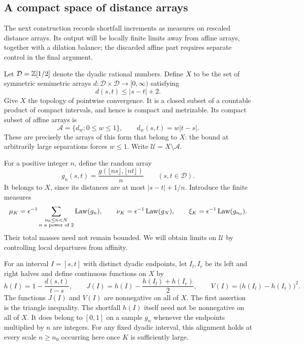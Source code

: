 \subsection{A compact space of distance arrays}

The next construction records shortfall increments as measures on
rescaled distance arrays. Its output will be locally finite limits
away from affine arrays, together with a dilation balance; the
discarded affine part requires separate control in the final argument.

Let $\mathcal D=\mathbb{Z}[1/2]$ denote the dyadic rational numbers. Define
$X$ to be the set of symmetric semimetric arrays
$d:\mathcal D\times\mathcal D\to[0,\infty)$ satisfying
\begin{equation}\label{scale:ambient-bound}
 d(s,t)\le|s-t|+2.
\end{equation}
Give $X$ the topology of pointwise convergence. It is a closed subset
of a countable product of compact intervals, and hence is compact
and metrizable. Its compact subset of affine arrays is
\[
 \mathcal A=\{d_w:0\le w\le1\},\qquad d_w(s,t)=w|t-s|.
\]
These are precisely the arrays of this form that belong to $X$:
the bound at arbitrarily large separations forces $w\le1$.
Write $\mathcal U=X\setminus\mathcal A$.

For a positive integer $n$, define the random array
\begin{equation}\label{scale:rescaled-array}
 g_n(s,t)=\frac{g(\lfloor ns\rfloor,\lfloor nt\rfloor)}{n}
 \qquad(s,t\in\mathcal D).
\end{equation}
It belongs to $X$, since its distances are at most
$|s-t|+1/n$. Introduce the finite measures
\begin{equation}\label{scale:prelimit-measures}
 \mu_K=\epsilon^{-1}\sum_{\substack{n_0\le n<N\\n\text{ a power of }2}}
                  \operatorname{Law}(g_n),\qquad
 \nu_K=\epsilon^{-1}\operatorname{Law}(g_N),\qquad
 \xi_K=\epsilon^{-1}\operatorname{Law}(g_{n_0}).
\end{equation}
Their total masses need not remain bounded. We will obtain limits on
$\mathcal U$ by controlling local departures from affinity.

For an interval $I=[s,t]$ with distinct dyadic endpoints, let $I_l,I_r$
be its left and right halves and define continuous functions on $X$ by
\begin{equation}\label{scale:tests}
 h(I)=1-\frac{d(s,t)}{t-s},\qquad
 J(I)=h(I)-\frac{h(I_l)+h(I_r)}{2},\qquad
 V(I)=\bigl(h(I_l)-h(I_r)\bigr)^2.
\end{equation}
The functions $J(I)$ and $V(I)$ are nonnegative on all of $X$.
The first assertion is the triangle inequality. The shortfall $h(I)$
itself need not be nonnegative on all of $X$. It does belong to $[0,1]$
on a sample $g_n$ whenever the endpoints multiplied by $n$ are integers.
For any fixed dyadic interval, this alignment holds at every scale
$n\ge n_0$ occurring here once $K$ is sufficiently large.

